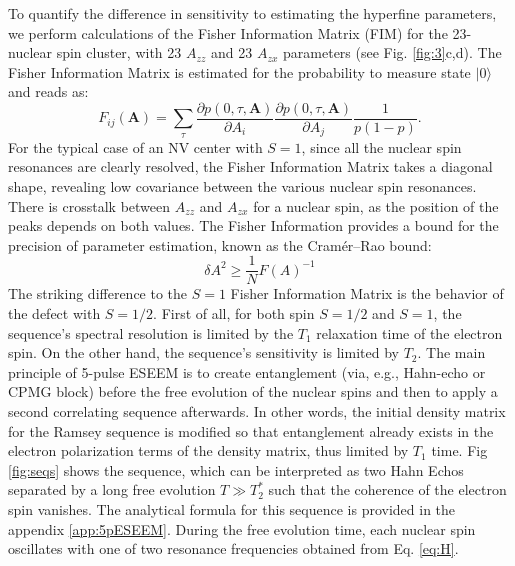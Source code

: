 \documentclass[%
 reprint,
superscriptaddress,
 amsmath,amssymb,
 aps,
]{revtex4-2}
\begin{document}
To quantify the difference in sensitivity to estimating the hyperfine parameters, we perform calculations of the Fisher Information Matrix (FIM) for the 23-nuclear spin cluster, with 23 $A_{zz}$ and 23 $A_{zx}$ parameters (see Fig. \ref{fig:3}c,d).
The Fisher Information Matrix is estimated for the probability to measure state $|0\rangle$ and reads as: 
\begin{equation}
	F_{ij}(\textbf{A})=\sum_\tau \frac{\partial p(0, \tau, \textbf{A})}{\partial A_i}\frac{\partial p(0, \tau, \textbf{A})}{ \partial A_j} \frac{1}{p (1-p)}.
\end{equation}
For the typical case of an NV center with $S=1$, since all the nuclear spin resonances are clearly resolved, the Fisher Information Matrix takes a diagonal shape, revealing low covariance between the various nuclear spin resonances.
There is crosstalk between $A_{zz}$ and $A_{zx}$ for a nuclear spin, as the position of the peaks depends on both values.
The Fisher Information provides a bound for the precision of parameter estimation, known as the Cramér–Rao bound: 
\begin{equation}
	\delta A^2 \ge \frac{1}{N} F(A)^{-1}
\end{equation}
The striking difference to the $S=1$ Fisher Information Matrix is the behavior of the defect with $S=1/2$.
First of all, for both spin $S=1/2$ and $S=1$, the sequence's spectral resolution is limited by the $T_1$ relaxation time of the electron spin.
On the other hand, the sequence's sensitivity is limited by $T_2$.
The main principle of 5-pulse ESEEM \cite{kasumaj20085} is to create entanglement (via, e.g., Hahn-echo or CPMG block) before the free evolution of the nuclear spins and then to apply a second correlating sequence afterwards.
In other words, the initial density matrix for the Ramsey sequence is modified so that entanglement already exists in the electron polarization terms of the density matrix, thus limited by $T_1$ time.
Fig \ref{fig:seqs} shows the sequence, which can be interpreted as two Hahn Echos separated by a long free evolution $T\gg T_2^\ast$ such that the coherence of the electron spin vanishes. The analytical formula for this sequence is provided in the appendix \ref{app:5pESEEM}.
During the free evolution time, each nuclear spin oscillates with one of two resonance frequencies obtained from Eq. \ref{eq:H}.
\end{document}
